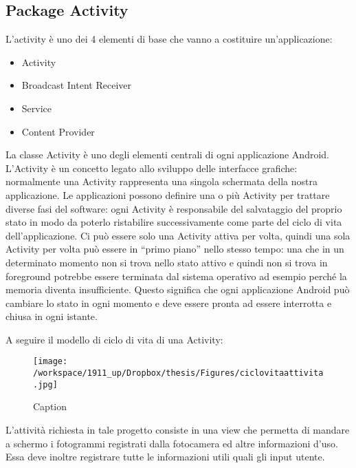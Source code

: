 \subsection{Package Activity}

L'activity è uno dei 4 elementi di base che vanno a costituire un'applicazione:

\begin{itemize}
\item Activity
\item Broadcast Intent Receiver
\item Service
\item Content Provider
\end{itemize}

La classe Activity è uno degli elementi centrali di ogni applicazione Android. L'Activity è un concetto legato allo sviluppo delle interfacce grafiche: normalmente una Activity rappresenta una singola schermata della nostra applicazione. Le applicazioni possono definire una o più Activity per trattare diverse fasi del software: ogni Activity è responsabile del salvataggio del proprio stato in modo da poterlo ristabilire successivamente come parte del ciclo di vita dell'applicazione.
Ci può essere solo una Activity attiva per volta, quindi una sola Activity per volta può essere in “primo piano” nello stesso tempo: una che in un determinato momento non si trova nello stato attivo e quindi non si trova in foreground potrebbe essere terminata dal sistema operativo ad esempio perché la memoria diventa insufficiente. Questo significa che ogni applicazione Android può cambiare lo stato in ogni momento e deve essere pronta ad essere interrotta e chiusa in ogni istante.

A seguire il modello di ciclo di vita di una Activity:

\begin{figure}[h]\centering  
\texttt{[image: /workspace/1911\_up/Dropbox/thesis/Figures/ciclovitaattivita.jpg]}
\caption[Long caption]{Caption}
\label{pic-a}
\end{figure}

L'attività richiesta in tale progetto consiste in una view che permetta di mandare a schermo i fotogrammi registrati dalla fotocamera ed altre informazioni d'uso. Essa deve inoltre registrare tutte le informazioni utili quali gli input utente.

